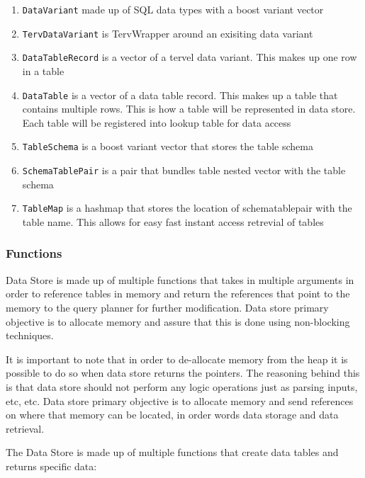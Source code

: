 \documentclass[letterpaper, 12pt]{article}
\newcommand{\inlinecode}[1]{\colorbox{codegrey}{\lstinline[language=C++]{#1}}}
\begin{document}
	\begin{enumerate}
		\item \inlinecode{DataVariant} made up of SQL data types with a boost variant vector
		\item \inlinecode{TervDataVariant} is TervWrapper around an exisiting data variant
		\item \inlinecode{DataTableRecord} is a vector of a tervel data variant. This makes up one row in
		a table
		\item \inlinecode{DataTable} is a vector of a data table record. This makes up a table that contains multiple rows.
		This is how a table will be represented in data store. Each table will be registered into lookup table
		for data access
		\item \inlinecode{TableSchema} is a boost variant vector that stores the table schema
		\item \inlinecode{SchemaTablePair} is a pair that bundles table nested vector with the table schema
		\item \inlinecode{TableMap} is a hashmap that stores the location of schematablepair with the table name. This
		allows for easy fast instant access retrevial of tables
	\end{enumerate}

\newpage
\subsubsection{Functions}
	Data Store is made up of multiple functions that takes in multiple arguments in order to reference tables in memory and return the references that point to the memory to the query planner for further modification. Data store primary objective is to allocate memory and assure that this is done using non-blocking techniques. 
	\par\vspace{\baselineskip}
	
	It is important to note that in order to de-allocate memory from the heap it is possible to do so when data store returns the pointers. The reasoning behind this is that data store should not perform any logic operations just as parsing inputs, etc, etc. Data store primary objective is to allocate memory and send references on where that memory can be located, in order words data storage and data retrieval. 
	\par\vspace{\baselineskip}
	The Data Store is made up of multiple functions that create data tables and returns specific data: 
	
\end{document}

